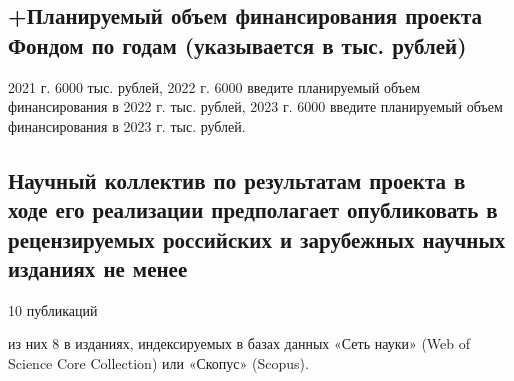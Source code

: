 \documentclass[12pt]{article}  %
\theoremstyle{remark}
\begin{document}
\subsection{+Планируемый объем финансирования проекта Фондом по годам (указывается в тыс. рублей)}
2021 г. 6000 тыс. рублей,
2022 г. 6000 введите планируемый объем финансирования в 2022 г. тыс. рублей,
2023 г. 6000 введите планируемый объем финансирования в 2023 г. тыс. рублей.

\subsection{Научный коллектив по результатам проекта в ходе его реализации предполагает опубликовать в рецензируемых российских и зарубежных научных изданиях не менее}

10 публикаций

из них 8 в изданиях, индексируемых в базах данных «Сеть науки» (Web of Science Core Collection) или «Скопус» (Scopus).
\end{document}
